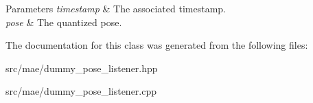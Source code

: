 \begin{DoxyParams}{Parameters}
{\em timestamp} & The associated timestamp. \\
\hline
{\em pose} & The quantized pose. \\
\hline
\end{DoxyParams}


The documentation for this class was generated from the following files\-:\begin{DoxyCompactItemize}
\item 
src/mae/dummy\-\_\-pose\-\_\-listener.\-hpp\item 
src/mae/dummy\-\_\-pose\-\_\-listener.\-cpp\end{DoxyCompactItemize}
